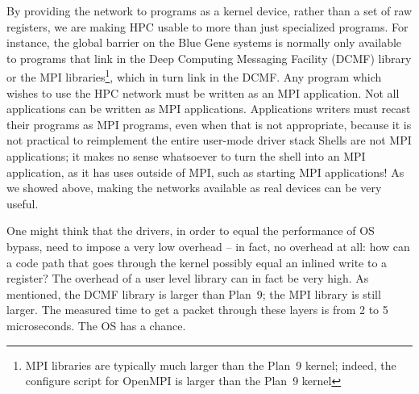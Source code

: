 \documentclass[letterpaper,twocolumn,10pt]{article}
\begin{document}
By providing the network to programs as a kernel device, rather than a set of raw registers, we are making HPC usable 
to more than just specialized programs. For instance, the global barrier on the Blue Gene systems is normally only 
available to programs that link in the Deep Computing Messaging Facility (DCMF) library or the 
MPI libraries\footnote{MPI libraries are typically much larger than the Plan~9 kernel; indeed, the configure script for OpenMPI is larger than the Plan~9 kernel}, which in turn 
link in the DCMF. Any program which wishes to use the HPC network must be written as an MPI 
application. Not all applications can be written as MPI applications. Applications writers must recast their 
programs as MPI programs, even when that is not appropriate, because it is not practical 
to reimplement the entire user-mode driver stack 
Shells are not MPI applications; it makes
no sense whatsoever to turn the shell into an MPI application, as it has uses outside of MPI, such 
as starting MPI applications! As we showed above, making the networks available as real devices can be very useful. 


One might think that the  drivers, in order to equal the performance of OS bypass, need to impose a very 
low overhead -- in fact, no overhead at all: how can a code path that goes through the kernel possibly equal an
inlined write to a register? The overhead of a user level library can in fact be very high. As mentioned, the DCMF library is larger than Plan~9; the 
MPI library is still larger. The measured time to get a packet through these layers is from 2 to 5 microseconds. The OS has a chance. 

\end{document}
